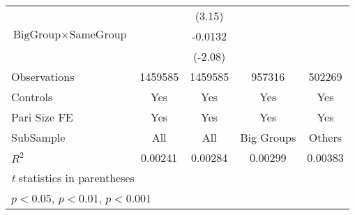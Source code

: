 {\begin{tabular}{l*{4}{c}}
{{                &                  &   (3.15)         &                  &                  \\
[1em]
$ {\text{BigGroup} } \times {\text{SameGroup} }  $ &                  &  -0.0132\sym{*}  &                  &                  \\
                &                  &  (-2.08)         &                  &                  \\
\hline
Observations    &  1459585         &  1459585         &   957316         &   502269         \\
Controls        &      Yes         &      Yes         &      Yes         &      Yes         \\
Pari Size FE    &      Yes         &      Yes         &      Yes         &      Yes         \\
SubSample       &      All         &      All         &Big Groups         &   Others         \\
$ R^2$          &  0.00241         &  0.00284         &  0.00299         &  0.00383         \\
\hline\hline
\multicolumn{5}{l}{\footnotesize \textit{t} statistics in parentheses}\\
\multicolumn{5}{l}{\footnotesize \sym{*} \(p<0.05\), \sym{**} \(p<0.01\), \sym{***} \(p<0.001\)}\\
\end{tabular}
}
